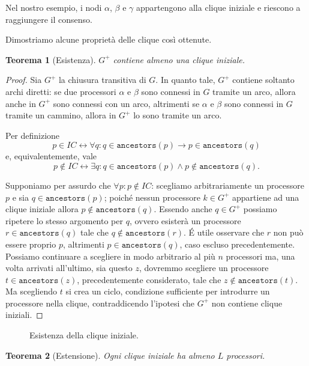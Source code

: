 \documentclass{article}
\newtheorem{teorema}{Teorema}
\begin{document}
Nel nostro esempio, i nodi $\alpha$, $\beta$ e $\gamma$ appartengono
alla clique iniziale e riescono a raggiungere il consenso.

 Dimostriamo alcune proprietà delle clique così ottenute.


\begin{teorema}[Esistenza]
\label{teorema:esistenzaInitialClique}
  $G^+$ contiene almeno una clique iniziale.
\end{teorema}
\begin{proof}
  Sia $G^+$ la chiusura transitiva di $G$. In quanto tale, $G^+$
  contiene soltanto archi diretti: se due processori $\alpha$ e
  $\beta$ sono connessi in $G$ tramite un arco, allora anche in $G^+$
  sono connessi con un arco, altrimenti se $\alpha$ e $\beta$ sono
  connessi in $G$ tramite un cammino, allora in $G^+$ lo sono tramite
  un arco. 
  
  Per definizione $$p\in IC\leftrightarrow\forall q:
  q\in\texttt{ancestors}(p)\rightarrow p\in\texttt{ancestors}(q)$$ e,
  equivalentemente, vale $$p\not\in IC\leftrightarrow\exists q:
  q\in\texttt{ancestors}(p)\wedge p\not\in\texttt{ancestors}(q).$$

  Supponiamo per assurdo che $\forall p: p\not\in IC$: scegliamo
  arbitrariamente un processore $p$ e sia $q \in \texttt{ancestors}(p)$;
  poiché nessun processore $k \in G^+$ appartiene ad una clique
  iniziale allora $p \not \in \texttt{ancestors}(q)$. Essendo anche $q
  \in G^+$ possiamo ripetere lo stesso argomento per $q$, ovvero
  esisterà un processore $r \in \texttt{ancestors}(q)$ tale che $q \not
  \in \texttt{ancestors}(r)$. \'E utile osservare che $r$ non può
  essere proprio $p$, altrimenti $p \in \texttt{ancestors}(q)$, caso
  escluso precedentemente. Possiamo continuare a scegliere in modo
  arbitrario al più $n$ processori ma, una volta arrivati all'ultimo,
  sia questo $z$, dovremmo scegliere un processore $t \in
  \texttt{ancestors}(z)$, precedentemente considerato, tale che $z
  \not \in \texttt{ancestors}(t)$. Ma scegliendo $t$ si crea un ciclo,
  condizione sufficiente per introdurre un processore nella clique,
  contraddicendo l'ipotesi che $G^+$ non contiene clique
  iniziali.
\end{proof}
\begin{figure}[!h]
  \centering \caption{Esistenza della clique
    iniziale.}\label{fig:chiusura}
\end{figure}
\begin{teorema}[Estensione]
\label{teorema:estensioneInitialClique}
  Ogni clique iniziale ha almeno $L$ processori.
\end{teorema}
\end{document}
